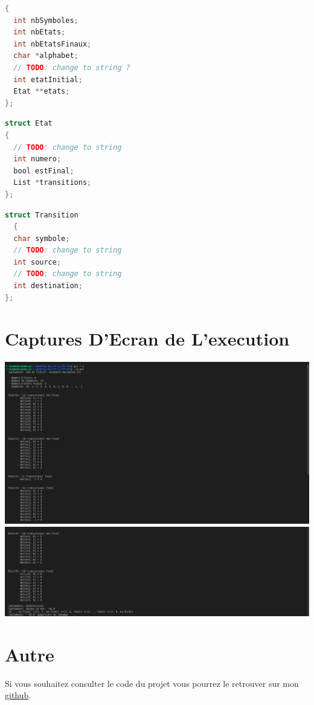 \documentclass{article}
\begin{document}
\begin{lstlisting}[language=C, caption=Structure Automate]
{
  int nbSymboles;
  int nbEtats;
  int nbEtatsFinaux;
  char *alphabet;
  // TODO: change to string ?
  int etatInitial;
  Etat **etats;
};
\end{lstlisting}

\begin{lstlisting}[language=C, caption=Structure Etat]
struct Etat
{
  // TODO: change to string
  int numero;
  bool estFinal;
  List *transitions;
};
\end{lstlisting}

\begin{lstlisting}[language=C, caption=Structure Etat]
struct Transition
  {
  char symbole;
  // TODO: change to string
  int source;
  // TODO: change to string
  int destination;
};
\end{lstlisting}



\section{Captures D'Ecran de L'execution}

\includegraphics[width=\textwidth]{screen-1.png}
\includegraphics[width=\textwidth]{screen-2.png}

\section{Autre}

Si vous souhaitez consulter le code du projet vous pourrez le retrouver sur mon \href{https://www.github.com/raideno/projet}{github}.
\end{document}
